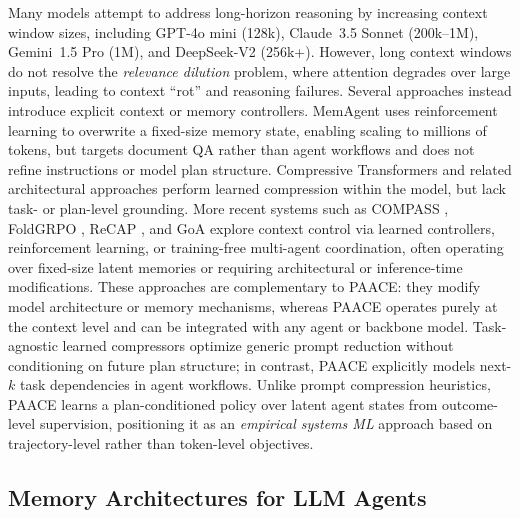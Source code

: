 \documentclass{article}
\theoremstyle{plain}
\theoremstyle{definition}
\theoremstyle{remark}
\begin{document}
Many models attempt to address long-horizon reasoning by increasing context
window sizes, including GPT-4o mini (128k), Claude~3.5 Sonnet (200k--1M),
Gemini~1.5 Pro (1M), and DeepSeek-V2 (256k+).
However, long context windows do not resolve the \emph{relevance dilution}
problem, where attention degrades over large inputs, leading to context
``rot'' and reasoning failures.
Several approaches instead introduce explicit context or memory controllers.
MemAgent \citep{yu2025memagent} uses reinforcement learning to overwrite a
fixed-size memory state, enabling scaling to millions of tokens, but targets
document QA rather than agent workflows and does not refine instructions or
model plan structure.
Compressive Transformers \citep{rae2020compressive} and related architectural
approaches perform learned compression within the model, but lack task- or
plan-level grounding.
More recent systems such as COMPASS \citep{li2024compass}, FoldGRPO
\citep{sun2025foldgrpo}, ReCAP \citep{zhang2025recap}, and GoA \citep{joo2025goa}
explore context control via learned controllers, reinforcement learning, or
training-free multi-agent coordination, often operating over fixed-size latent
memories or requiring architectural or inference-time modifications.
These approaches are complementary to PAACE: they modify model architecture
or memory mechanisms, whereas PAACE operates purely at the context level and
can be integrated with any agent or backbone model.
Task-agnostic learned compressors \citep{sun2023promptcompression} optimize
generic prompt reduction without conditioning on future plan structure; in
contrast, PAACE explicitly models next-$k$ task dependencies in agent workflows. Unlike prompt compression heuristics, PAACE learns a plan-conditioned policy over latent agent states from outcome-level supervision, positioning it as an \emph{empirical systems ML} approach based on trajectory-level rather than token-level objectives.






\subsection{Memory Architectures for LLM Agents}
\end{document}
